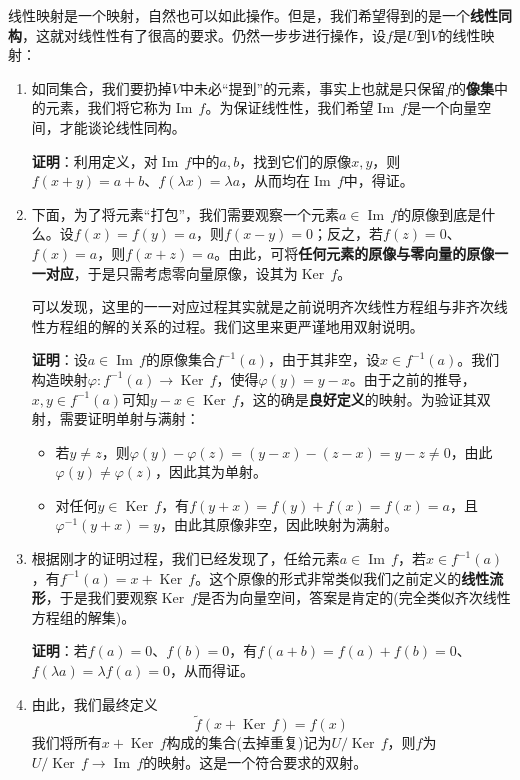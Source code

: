 \documentclass[a4paper,UTF8,fontset=windows]{ctexart}
\DeclareMathOperator{\im}{Im\,}
\DeclareMathOperator{\Ker}{Ker\,}
\begin{document}
线性映射是一个映射，自然也可以如此操作。但是，我们希望得到的是一个\textbf{线性同构}，这就对线性性有了很高的要求。仍然一步步进行操作，设$f$是$U$到$V$的线性映射：
\begin{enumerate}
    \item 如同集合，我们要扔掉$V$中未必``提到''的元素，事实上也就是只保留$f$的\textbf{像集}中的元素，我们将它称为$\im f$。为保证线性性，我们希望$\im f$是一个向量空间，才能谈论线性同构。
    
    \textbf{证明}：利用定义，对$\im f$中的$a,b$，找到它们的原像$x,y$，则$f(x+y)=a+b$、$f(\lambda x)=\lambda a$，从而均在$\im f$中，得证。

    \item 下面，为了将元素``打包''，我们需要观察一个元素$a\in\im f$的原像到底是什么。设$f(x)=f(y)=a$，则$f(x-y)=0$；反之，若$f(z)=0$、$f(x)=a$，则$f(x+z)=a$。由此，可将\textbf{任何元素的原像与零向量的原像一一对应}，于是只需考虑零向量原像，设其为$\Ker f$。
    
    可以发现，这里的一一对应过程其实就是之前说明齐次线性方程组与非齐次线性方程组的解的关系的过程。我们这里来更严谨地用双射说明。

    \textbf{证明}：设$a\in\im f$的原像集合$f^{-1}(a)$，由于其非空，设$x\in f^{-1}(a)$。我们构造映射$\varphi:f^{-1}(a)\to\Ker f$，使得$\varphi(y)=y-x$。由于之前的推导，$x,y\in f^{-1}(a)$可知$y-x\in\Ker f$，这的确是\textbf{良好定义}的映射。为验证其双射，需要证明单射与满射：
    \begin{itemize}
        \item 若$y\ne z$，则$\varphi(y)-\varphi(z)=(y-x)-(z-x)=y-z\ne 0$，由此$\varphi(y)\ne\varphi(z)$，因此其为单射。
        \item 对任何$y\in\Ker f$，有$f(y+x)=f(y)+f(x)=f(x)=a$，且$\varphi^{-1}(y+x)=y$，由此其原像非空，因此映射为满射。
    \end{itemize}

    \item 根据刚才的证明过程，我们已经发现了，任给元素$a\in\im f$，若$x\in f^{-1}(a)$，有$f^{-1}(a)=x+\Ker f$。这个原像的形式非常类似我们之前定义的\textbf{线性流形}，于是我们要观察$\Ker f$是否为向量空间，答案是肯定的(完全类似齐次线性方程组的解集)。
    
    \textbf{证明}：若$f(a)=0$、$f(b)=0$，有$f(a+b)=f(a)+f(b)=0$、$f(\lambda a)=\lambda f(a)=0$，从而得证。 
    
    \item 由此，我们最终定义
    $$\tilde{f}(x+\Ker f)=f(x)$$
    我们将所有$x+\Ker f$构成的集合(去掉重复)记为$U/\Ker f$，则$f$为$U/\Ker f\to\im f$的映射。这是一个符合要求的双射。


\end{enumerate}
\end{document}
